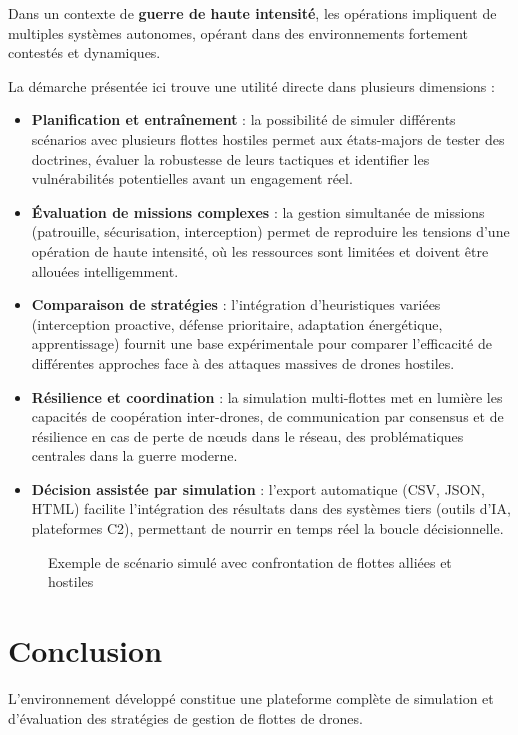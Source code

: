 \documentclass[a4paper,11pt]{article}
\begin{document}
Dans un contexte de \textbf{guerre de haute intensité}, les opérations impliquent de multiples systèmes
autonomes, opérant dans des environnements fortement contestés et dynamiques.  

La démarche présentée ici trouve une utilité directe dans plusieurs dimensions :

\begin{itemize}
  \item \textbf{Planification et entraînement} : la possibilité de simuler différents scénarios
  avec plusieurs flottes hostiles permet aux états-majors de tester des doctrines, évaluer la robustesse
  de leurs tactiques et identifier les vulnérabilités potentielles avant un engagement réel.

  \item \textbf{Évaluation de missions complexes} : la gestion simultanée de missions (patrouille,
  sécurisation, interception) permet de reproduire les tensions d'une opération de haute intensité,
  où les ressources sont limitées et doivent être allouées intelligemment.

  \item \textbf{Comparaison de stratégies} : l’intégration d’heuristiques variées (interception proactive,
  défense prioritaire, adaptation énergétique, apprentissage) fournit une base expérimentale
  pour comparer l’efficacité de différentes approches face à des attaques massives de drones hostiles.

  \item \textbf{Résilience et coordination} : la simulation multi-flottes met en lumière les
  capacités de coopération inter-drones, de communication par consensus et de résilience
  en cas de perte de nœuds dans le réseau, des problématiques centrales dans la guerre moderne.

  \item \textbf{Décision assistée par simulation} : l’export automatique (CSV, JSON, HTML)
  facilite l’intégration des résultats dans des systèmes tiers (outils d’IA, plateformes C2),
  permettant de nourrir en temps réel la boucle décisionnelle.
\end{itemize}

\begin{figure}[h!]
\centering
{}
\caption{Exemple de scénario simulé avec confrontation de flottes alliées et hostiles}
\end{figure}

\section{Conclusion}
L'environnement développé constitue une plateforme complète de simulation et d'évaluation
des stratégies de gestion de flottes de drones.  
\end{document}
